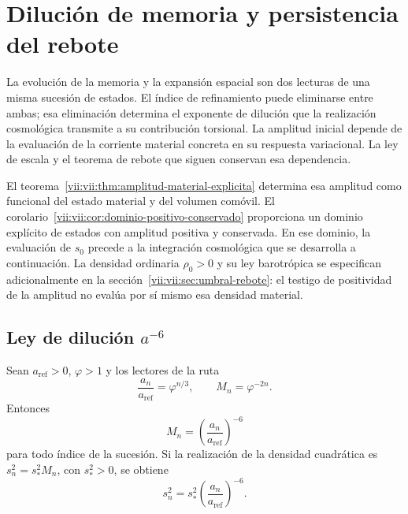 
\section{Dilución de memoria y persistencia del rebote}
\label{vii:vii:sec:dilucion-rebote}

La evolución de la memoria y la expansión espacial son dos lecturas de
una misma sucesión de estados. El índice de refinamiento puede eliminarse
entre ambas; esa eliminación determina el exponente de dilución que la
realización cosmológica transmite a su contribución torsional.
La amplitud inicial depende de la evaluación de la corriente material
concreta en su respuesta variacional. La ley de escala y el teorema
de rebote que siguen conservan esa dependencia.

El teorema~\ref{vii:vii:thm:amplitud-material-explicita} determina esa
amplitud como funcional del estado material y del volumen comóvil.
El corolario~\ref{vii:vii:cor:dominio-positivo-conservado} proporciona
un dominio explícito de estados con amplitud positiva y conservada.
En ese dominio, la evaluación de \(s_0\) precede a la integración
cosmológica que se desarrolla a continuación. La densidad ordinaria
\(\rho_0>0\) y su ley barotrópica se especifican adicionalmente en la
sección~\ref{vii:vii:sec:umbral-rebote}: el testigo de positividad de la
amplitud no evalúa por sí mismo esa densidad material.

\subsection{Ley de dilución \(a^{-6}\)}
\label{vii:vii:sec:dilucion}

\begin{proposition}
\label{vii:vii:prop:dilucion}
Sean \(a_{\mathrm{ref}}>0\), \(\varphi>1\) y los lectores de la ruta
\[
 \frac{a_n}{a_{\mathrm{ref}}}=\varphi^{n/3},\qquad
 M_n=\varphi^{-2n}.
\]
Entonces
\[
 M_n=\left(\frac{a_n}{a_{\mathrm{ref}}}\right)^{-6}
\]
para todo índice de la sucesión. Si la realización de la densidad
cuadrática es \(s_n^2=s_*^2M_n\), con \(s_*^2>0\), se obtiene
\[
 s_n^2=s_*^2\left(\frac{a_n}{a_{\mathrm{ref}}}\right)^{-6}.
\]
\end{proposition}

